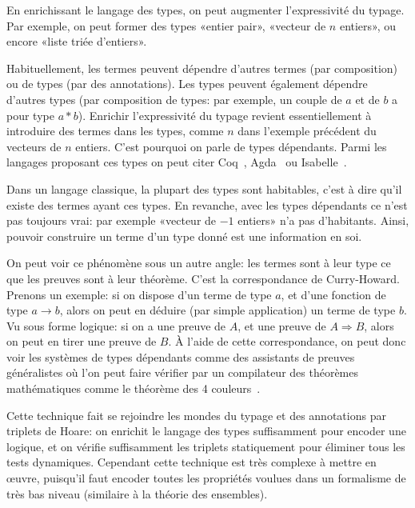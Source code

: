 En enrichissant le langage des types, on peut augmenter l'expressivité du
typage. Par exemple, on peut former des types «entier pair», «vecteur de $n$
entiers», ou encore «liste triée d'entiers».

Habituellement, les termes peuvent dépendre d'autres termes (par composition) ou
de types (par des annotations). Les types peuvent également dépendre d'autres
types (par composition de types: par exemple, un couple de $a$ et de $b$ a pour
type $a * b$). Enrichir l'expressivité du typage revient essentiellement à
introduire des termes dans les types, comme $n$ dans l'exemple précédent du
vecteurs de $n$ entiers. C'est pourquoi on parle de types dépendants. Parmi les
langages proposant ces types on peut citer Coq~\cite{coqmanual},
Agda~\cite{agdatutorial} ou Isabelle~\cite{isabelletutorial}.

Dans un langage classique, la plupart des types sont habitables, c'est à dire
qu'il existe des termes ayant ces types. En revanche, avec les types dépendants
ce n'est pas toujours vrai: par exemple «vecteur de $-1$ entiers» n'a pas
d'habitants. Ainsi, pouvoir construire un terme d'un type donné est une
information en soi.


On peut voir ce phénomène sous un autre angle: les termes sont à leur type ce
que les preuves sont à leur théorème. C'est la correspondance de Curry-Howard.
Prenons un exemple: si on dispose d'un terme de type $a$, et d'une fonction de
type $a → b$, alors on peut en déduire (par simple application) un terme de type
$b$. Vu sous forme logique: si on a une preuve de $A$, et une preuve de $A ⇒
B$, alors on peut en tirer une preuve de $B$. À l'aide de cette correspondance,
on peut donc voir les systèmes de types dépendants comme des assistants de
preuves généralistes où l'on peut faire vérifier par un compilateur des
théorèmes mathématiques comme le théorème des 4 couleurs~\cite{4colproof}.


Cette technique fait se rejoindre les mondes du typage et des annotations par
triplets de Hoare: on enrichit le langage des types suffisamment pour encoder
une logique, et on vérifie suffisamment les triplets statiquement pour éliminer
tous les tests dynamiques. Cependant cette technique est très complexe à mettre
en œuvre, puisqu'il faut encoder toutes les propriétés voulues dans un
formalisme de très bas niveau (similaire à la théorie des ensembles).

